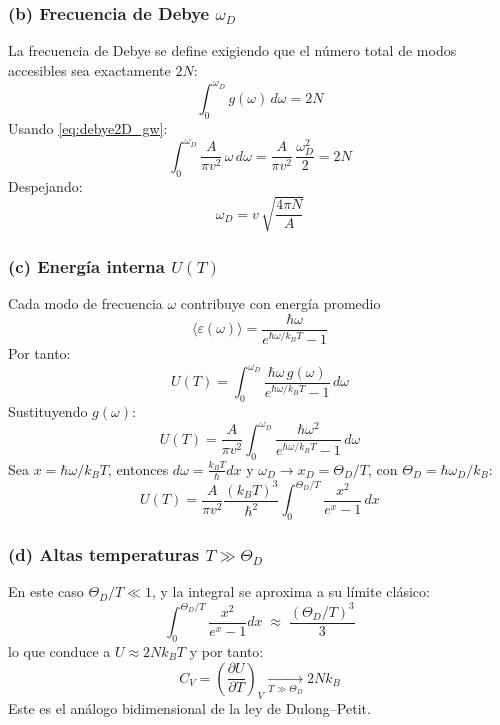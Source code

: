 \documentclass{article}
\begin{document}
\subsubsection*{\textbf{(b) Frecuencia de Debye $\omega_D$}}
La frecuencia de Debye se define exigiendo que el número total de modos accesibles sea exactamente $2N$:
\[
\int_{0}^{\omega_D} g(\omega)\,d\omega = 2N
\]
Usando \eqref{eq:debye2D_gw}:
\[
\int_{0}^{\omega_D} \frac{A}{\pi v^2}\,\omega\,d\omega
= \frac{A}{\pi v^2}\,\frac{\omega_D^2}{2}
= 2N
\]
Despejando:
\begin{equation}
\boxed{\,\omega_D = v\,\sqrt{\frac{4\pi N}{A}}\,}
\label{eq:debye2D_wD}
\end{equation}

\subsubsection*{\textbf{(c) Energía interna $U(T)$}}
Cada modo de frecuencia $\omega$ contribuye con energía promedio
\[
\langle \varepsilon(\omega) \rangle = \frac{\hbar\omega}{e^{\hbar\omega/k_BT}-1}
\]
Por tanto:
\[
U(T)=\int_{0}^{\omega_D} \frac{\hbar\omega\,g(\omega)}{e^{\hbar\omega/k_BT}-1}\,d\omega
\]
Sustituyendo $g(\omega)$:
\[
U(T)=\frac{A}{\pi v^2}\int_{0}^{\omega_D}\frac{\hbar\omega^2}{e^{\hbar\omega/k_BT}-1}\,d\omega
\]
Sea $x=\hbar\omega/k_BT$, entonces $d\omega=\frac{k_BT}{\hbar}dx$ y $\omega_D \rightarrow x_D=\Theta_D/T$, con $\Theta_D=\hbar\omega_D/k_B$:
\begin{equation}
\boxed{\,U(T)=\frac{A}{\pi v^2}\frac{(k_BT)^3}{\hbar^2}\int_{0}^{\Theta_D/T}\frac{x^2}{e^{x}-1}\,dx\,}
\label{eq:debye2D_U}
\end{equation}

\subsubsection*{\textbf{(d) Altas temperaturas $T\gg \Theta_D$}}
En este caso $\Theta_D/T \ll 1$, y la integral se aproxima a su límite clásico:
\[
\int_{0}^{\Theta_D/T}\frac{x^2}{e^{x}-1}dx \;\approx\; \frac{(\Theta_D/T)^3}{3}
\]
lo que conduce a $U \approx 2Nk_BT$ y por tanto:
\begin{equation}
\boxed{\,C_V = \left(\frac{\partial U}{\partial T}\right)_V \xrightarrow[T\gg\Theta_D]{} 2N k_B\,}
\label{eq:debye2D_Cv_altaT}
\end{equation}
Este es el análogo bidimensional de la ley de Dulong–Petit.
\end{document}
